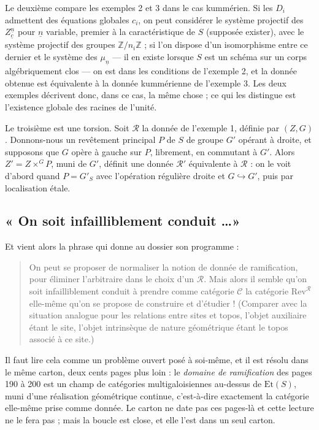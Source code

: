 \documentclass[11pt,a4paper]{article}
\begin{document}
Le deuxième compare les exemples 2 et 3 dans le cas kummérien. Si les $D_{i}$
admettent des équations globales $c_{i}$, on peut considérer le système
projectif des $Z^{\underline{n}}_{\underline{c}}$ pour $\underline{n}$
variable, premier à la caractéristique de $S$ (supposée exister), avec le
système projectif des groupes $\mathbb{Z}/n_{i}\mathbb{Z}$ ; si l'on dispose
d'un isomorphisme entre ce dernier et le système des $\mu_{\underline{n}}$ ---
il en existe lorsque $S$ est un schéma sur un corps algébriquement clos --- on
est dans les conditions de l'exemple 2, et la donnée obtenue est équivalente à
la donnée kummérienne de l'exemple 3. Les deux exemples décrivent donc, dans ce
cas, la même chose ; ce qui les distingue est l'existence globale des racines
de l'unité.

Le troisième est une torsion. Soit $\mathcal{R}$ la donnée de l'exemple 1,
définie par $(Z,G)$. Donnons-nous un revêtement principal $P$ de $S$ de groupe
$G'$ opérant à droite, et supposons que $G$ opère à gauche sur $P$, librement,
en commutant à $G'$. Alors $Z' = Z \times^{G} P$, muni de $G'$, définit une
donnée $\mathcal{R}'$ équivalente à $\mathcal{R}$ : on le voit d'abord quand
$P = G'_{S}$ avec l'opération régulière droite et $G \hookrightarrow G'$, puis
par localisation étale.

\subsection*{« On soit infailliblement conduit \dots »}

Et vient alors la phrase qui donne au dossier son programme :

\begin{quote}
On peut se proposer de normaliser la notion de donnée de ramification, pour
éliminer l'arbitraire dans le choix d'un $\mathcal{R}$. Mais alors il semble
qu'on soit infailliblement conduit à prendre comme catégorie $\mathcal{C}$ la
catégorie $\mathrm{Rev}^{\mathcal{R}}$ elle-même qu'on se propose de construire
et d'étudier ! (Comparer avec la situation analogue pour les relations entre
sites et topos, l'objet auxiliaire étant le site, l'objet intrinsèque de nature
géométrique étant le topos associé à ce site.)
\end{quote}

Il faut lire cela comme un problème ouvert posé à soi-même, et il est résolu
dans le même carton, deux cents pages plus loin : le \emph{domaine de
ramification} des pages 190 à 200 est un champ de catégories multigaloisiennes
au-dessus de $\mathrm{Et}(S)$, muni d'une réalisation géométrique continue,
c'est-à-dire exactement la catégorie elle-même prise comme donnée. Le carton ne
date pas ces pages-là et cette lecture ne le fera pas ; mais la boucle est
close, et elle l'est dans un seul carton.
\end{document}
